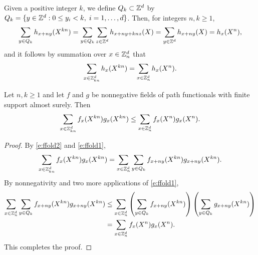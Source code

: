 Given a positive integer $k$, we define
$Q_k \subset {\mathbb Z}^d$ by $Q_k = \{y \in {\mathbb Z}^d : 0 \le y_i < k, \;   i=1,\ldots,d\}$.
Then, for integers $n,k \ge 1$,
\begin{equation}
\label{e:ffold1}
    \sum_{y \in Q_k} h_{x+ny}(X^{kn})
  = \sum_{y \in Q_k} \sum_{z\in{ {{\mathbb Z}}^d }} h_{x+ny+knz}(X)
  = \sum_{y\in{ {{\mathbb Z}}^d }} h_{x+ny}(X)
  = h_x(X^n),
\end{equation}
and it follows by summation over $x \in {\mathbb Z}^d_n$ that
\begin{equation}
\label{e:ffold2}
\sum_{x\in{\mathbb Z}^d_{kn}} h_x(X^{kn})
  =
\sum_{x\in{\mathbb Z}^d_n} h_x(X^n).
\end{equation}

\begin{lemma}
\label{lem:mono}
Let $n,k \ge 1$ and let $f$ and $g$ be nonnegative fields of path functionals
with finite support almost surely.
Then
\begin{equation}
\sum_{x\in{\mathbb Z}^d_{kn}} f_x(X^{kn}) g_x(X^{kn})
  \leq
\sum_{x\in{\mathbb Z}^d_n} f_x(X^n) g_x(X^n).
\end{equation}
\end{lemma}

\begin{proof}
By \eqref{e:ffold2} and \eqref{e:ffold1},
\begin{equation}
\sum_{x\in\Z_{kn}^d} f_x(X^{kn}) g_x(X^{kn})
  =
\sum_{x\in\Z_n^d}
\sum_{y \in Q_k}
  f_{x+ny}(X^{kn}) g_{x+ny}(X^{kn}).
\lbeq{mono}
\end{equation}
By nonnegativity and two more applications of \eqref{e:ffold1},
\begin{align}
\sum_{x\in{\mathbb Z}_n^d}
\sum_{y \in Q_k}
f_{x+ny}(X^{kn}) g_{x+ny}(X^{kn})
  &\le \sum_{x\in{\mathbb Z}_n^d}
      \left(\sum_{y \in Q_k} f_{x+ny}(X^{kn})\right)
      \left(\sum_{y \in Q_k} g_{x+ny}(X^{kn})\right) \nonumber \\
  &= \sum_{x\in{\mathbb Z}_n^d} f_x(X^n) g_x(X^n).
\end{align}
This completes the proof.
\end{proof}

